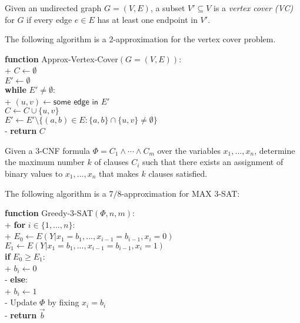 \documentclass{article}
\begin{document}
\begin{definition}
	Given an undirected graph $G=(V,E)$, a subset $V'\subseteq V$ is a
	\emph{vertex cover (VC)} for $G$ if every edge $e\in E$ has at least one
	endpoint in $V'$.
\end{definition}

\begin{theorem}
	The following algorithm is a 2-approximation for the vertex cover
	problem.
	\begin{pseudo}
		\textbf{function} \textsf{Approx-Vertex-Cover}$(G=(V,E))$:\\+
		$C\leftarrow \emptyset$\\
		$E'\leftarrow\emptyset$\\
		\textbf{while} $E'\not=\emptyset$:\\+
		$(u,v)\leftarrow\textsf{some edge in }E'$\\
		$C\leftarrow C\cup\{u,v\}$\\
		$E'\leftarrow E'\setminus\{(a,b)\in E : \{a,b\}\cap\{u,v\}\not=\emptyset\}$\\-
		\textbf{return} $C$
	\end{pseudo}
\end{theorem}

\begin{definition}
	Given a 3-CNF formula $\Phi=C_1\wedge\cdots\wedge C_m$ over the variables
	$x_1, ..., x_n$, determine the maximum number $k$ of clauses $C_i$ such
	that there exists an assignment of binary values to $x_1, ..., x_n$ that
	makes $k$ clauses satisfied.
\end{definition}

\begin{theorem}
	The following algorithm is a $7/8$-approximation for \textsf{MAX 3-SAT}:
	\begin{pseudo}
		\textbf{function} \textsf{Greedy-3-SAT}$(\Phi, n, m)$:\\+
		\textbf{for} $i\in\{1,...,n\}$:\\+
		$E_0 \leftarrow E(Y|x_1=b_1, ...,x_{i-1}=b_{i-1},x_i=0)$\\
		$E_1 \leftarrow E(Y|x_1=b_1, ...,x_{i-1}=b_{i-1},x_i=1)$\\
		\textbf{if} $E_0\geq E_1$:\\+
		$b_i\leftarrow 0$\\-
		\textbf{else}:\\+
		$b_i\leftarrow 1$\\-
		Update $\Phi$ by fixing $x_i=b_i$\\-
		\textbf{return }$\vec b$
	\end{pseudo}
\end{theorem}
\end{document}
